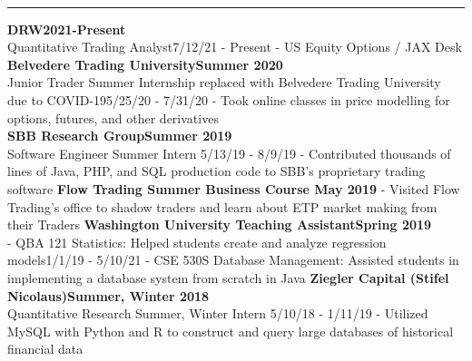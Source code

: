 \documentclass[11pt]{article}
\begin{document}
\begin{titlepage}
\begin{addmargin}[1em]{0em}
\begin{center}
\begin{minipage}[b]{0.3\textwidth}
				\end{minipage}
			\end{center}
		\end{addmargin}
		\vspace{-10pt}
		\noindent
		\\\rule{\textwidth}{0.4pt}
		\begin{addmargin}[1em]{0em}
			\textbf{DRW\hfill 2021-Present}\\
				Quantitative Trading Analyst\hfill {\small{7/12/21 - Present}}\newline
				- US Equity Options / JAX Desk\\
		    \textbf{Belvedere Trading University\hfill Summer 2020}\\
				Junior Trader Summer Internship replaced with Belvedere Trading University due to COVID-19\hfill {\small{5/25/20 - 7/31/20}}\newline
				- Took online classes in price modelling for options, futures, and other derivatives\\
    		\textbf{SBB Research Group\hfill Summer 2019}\\
				Software Engineer Summer Intern \hfill {\small{5/13/19 - 8/9/19}}\newline
				- Contributed thousands of lines of Java, PHP, and SQL production code to SBB's proprietary trading software\newline
            \textbf{Flow Trading Summer Business Course \hfill May 2019}\newline
				- Visited Flow Trading's office to shadow traders and learn about ETP market making from their Traders\newline
		    \textbf{Washington University Teaching Assistant\hfill Spring 2019}\\
				- QBA 121 Statistics: Helped students create and analyze regression models\hfill {\small{1/1/19 - 5/10/21}}\newline
				- CSE 530S Database Management: Assisted students in implementing a database system from scratch in Java\newline
			\textbf{Ziegler Capital (Stifel Nicolaus)\hfill Summer, Winter 2018}\\
				Quantitative Research Summer, Winter Intern \hfill {\small{5/10/18 - 1/11/19}}\newline
				- Utilized MySQL with Python and R to construct and query large databases of historical financial data \newline

\end{addmargin}
\end{titlepage}
\end{document}
